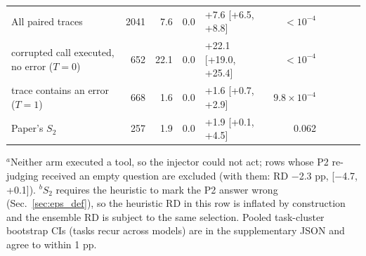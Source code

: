 \begin{table}[t]
\begin{tabular}{l r r r l r r l r l}
All paired traces & 2041 & 7.6 & 0.0 & +7.6 [+6.5, +8.8] & $<10^{-4}$ & & & & \\
\quad corrupted call executed, no error ($T{=}0$) & 652 & 22.1 & 0.0 & +22.1 [+19.0, +25.4] & $<10^{-4}$ & & & & \\
\quad trace contains an error ($T{=}1$) & 668 & 1.6 & 0.0 & +1.6 [+0.7, +2.9] & $9.8\times10^{-4}$ & & & & \\
Paper's $S_2$ & 257 & 1.9 & 0.0 & +1.9 [+0.1, +4.5] & 0.062 & & & & \\
\bottomrule
\end{tabular}
\par\smallskip\footnotesize $^{a}$Neither arm executed a tool, so the injector could not act; rows whose P2 re-judging received an empty question are excluded (with them: RD $-$2.3 pp, [$-$4.7, +0.1]). $^{b}$$S_2$ requires the heuristic to mark the P2 answer wrong (Sec.~\ref{sec:eps_def}), so the heuristic RD in this row is inflated by construction and the ensemble RD is subject to the same selection. Pooled task-cluster bootstrap CIs (tasks recur across models) are in the supplementary JSON and agree to within 1 pp.
\end{table}
